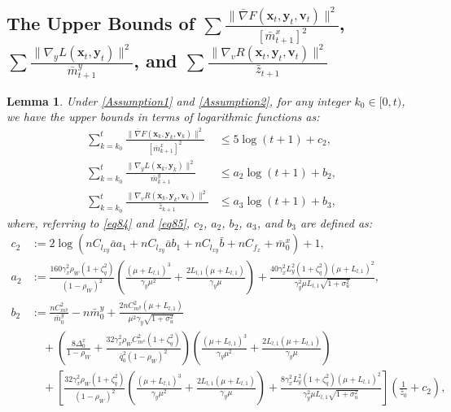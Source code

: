 \documentclass{article}
\theoremstyle{plain}
\newtheorem{lemma}[lemma]{Lemma}
\theoremstyle{definition}
\theoremstyle{remark}
\begin{document}
\subsection{The Upper Bounds of $\sum \frac{\| \bar{\nabla} F(\mathbf{x}_{t},\mathbf{y}_{t},\mathbf{v}_{t})\|^2}{[\bar{m}^x_{t+1}]^2}$, $\sum \frac{\|\nabla_y L(\mathbf{x}_t, \mathbf{y}_t)\|^2}{\bar{m}^y_{t+1}}$, and $\sum \frac{\|\nabla_v R(\mathbf{x}_t, \mathbf{y}_t, \mathbf{v}_t)\|^2}{\bar{z}_{t+1}}$}\label{secc.6}
\begin{lemma}\label{Lemma11} Under \cref{Assumption1} and \cref{Assumption2}, for any integer $k_0 \in [0, t)$, we have the upper bounds in terms of logarithmic functions as:
\begin{align}
\sum_{k=k_0}^t \frac{\|\bar{\nabla} F(\mathbf{x}_k,\mathbf{y}_k,\mathbf{v}_k)\|^2}{[\bar{m}^x_{k+1}]^2} &\leq 5 \log(t + 1) + c_2,\nonumber\\
\sum_{k=k_0}^t \frac{\|\nabla_y L(\mathbf{x}_k, \mathbf{y}_k)\|^2}{\bar{m}^y_{k+1}} &\leq a_2 \log(t + 1) + b_2, \nonumber\\
\sum_{k=k_0}^t \frac{\|\nabla_v R(\mathbf{x}_k, \mathbf{y}_k, \mathbf{v}_k)\|^2}{\bar{z}_{k+1}} &\leq a_3 \log(t + 1) + b_3,\label{eq105}
\end{align}
where, referring to \cref{eq84} and \cref{eq85}, $c_2$, $a_2$, $b_2$, $a_3$, and $b_3$ are defined as:
\begin{align}
c_2 &:= 2 \log \left( nC_{l_{xy}} \bar{a} a_1+nC_{l_{xy}} \bar{a}b_1 + nC_{l_{xy}} \bar{b} + nC_{f_x} +\bar{m}^x_0\right) + 1, \nonumber\\
a_2 &:= \frac{160 \gamma_x^2 \rho_W(1 + \zeta_q^2)}{(1 - \rho_W)^2} \left(\frac{(\mu+L_{l,1})^3}{\gamma_y\mu^2}+\frac{2L_{l,1}(\mu+L_{l,1})}{\gamma_y\mu}\right)+\frac{40\gamma_x^2  L_y^2\left( 1 + \zeta_q^2 \right) (\mu + L_{l,1})^2}{\gamma_y^2\mu L_{l,1}\sqrt{1+\sigma_u^2}}, \nonumber\\
b_2 &:=\frac{nC_{m^y}^2}{\bar{m}^y_0} - n\bar{m}^y_0 + \frac{ 2nC_{m^y}^2(\mu + L_{l,1})}{\mu^2\gamma_y\sqrt{1+\sigma_u^2}}\nonumber\\
&\quad+\left(\frac{8\Delta_0^x}{1-\rho_W}+\frac{32 \gamma_x^2 \rho_WC_{m^x}^2 (1 + \zeta_q^2)}{\bar{q}_0^2(1 - \rho_W)^2} \right)\left(\frac{(\mu+L_{l,1})^3}{\gamma_y\mu^2}+\frac{2L_{l,1}(\mu+L_{l,1})}{\gamma_y\mu}\right)\nonumber\\
&\quad +\!\left[\!\frac{32 \gamma_x^2 \rho_W(1 \!+\! \zeta_q^2)}{(1 \!-\! \rho_W)^2} \!\!\left(\frac{(\mu\!+\!L_{l,1})^3}{\gamma_y\mu^2}\!+\!\frac{2L_{l,1}(\mu\!+\!L_{l,1})}{\gamma_y\mu}\right)\!+\!\frac{8\gamma_x^2  L_y^2\left( 1 \!+\! \zeta_q^2 \right) (\mu \!+\! L_{l,1})^2}{\gamma_y^2\mu L_{l,1}\sqrt{1\!+\!\sigma_u^2}}\!\right]\!\!\left(\!\frac{1}{\bar{z}_0}\!+\!c_2\!\right), \nonumber\\

\end{align}
\end{lemma}
\end{document}

